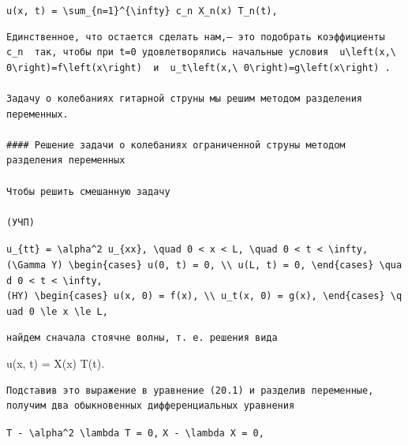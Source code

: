 \documentclass[
  ukrainian,
]{article}
\begin{document}
\texttt{u(x,\ t)\ =\ \textbackslash{}sum\_\{n=1\}\^{}\{\textbackslash{}infty\}\ c\_n\ X\_n(x)\ T\_n(t),}

\begin{verbatim}
Единственное, что остается сделать нам,— это подобрать коэффициенты  c_n  так, чтобы при t=0 удовлетворялись начальные условия  u\left(x,\ 0\right)=f\left(x\right)  и  u_t\left(x,\ 0\right)=g\left(x\right) .

Задачу о колебаниях гитарной струны мы решим методом разделения переменных.

#### Решение задачи о колебаниях ограниченной струны методом разделения переменных

Чтобы решить смешанную задачу

(УЧП)
\end{verbatim}

\texttt{u\_\{tt\}\ =\ \textbackslash{}alpha\^{}2\ u\_\{xx\},\ \textbackslash{}quad\ 0\ \textless{}\ x\ \textless{}\ L,\ \textbackslash{}quad\ 0\ \textless{}\ t\ \textless{}\ \textbackslash{}infty,}
\texttt{(\textbackslash{}Gamma\ Y)\ \textbackslash{}begin\{cases\}\ u(0,\ t)\ =\ 0,\ \textbackslash{}\textbackslash{}\ u(L,\ t)\ =\ 0,\ \textbackslash{}end\{cases\}\ \textbackslash{}quad\ 0\ \textless{}\ t\ \textless{}\ \textbackslash{}infty,}
\texttt{(HY)\ \textbackslash{}begin\{cases\}\ u(x,\ 0)\ =\ f(x),\ \textbackslash{}\textbackslash{}\ u\_t(x,\ 0)\ =\ g(x),\ \textbackslash{}end\{cases\}\ \textbackslash{}quad\ 0\ \textbackslash{}le\ x\ \textbackslash{}le\ L,}

\begin{verbatim}
найдем сначала стоячне волны, т. е. решения вида
\end{verbatim}

u(x, t) = X(x) T(t).

\begin{verbatim}
Подставив это выражение в уравнение (20.1) и разделив переменные, получим два обыкновенных дифференциальных уравнения
\end{verbatim}

\texttt{T\textquotesingle{}\textquotesingle{}\ -\ \textbackslash{}alpha\^{}2\ \textbackslash{}lambda\ T\ =\ 0,}
\texttt{X\textquotesingle{}\textquotesingle{}\ -\ \textbackslash{}lambda\ X\ =\ 0,}
\end{document}
